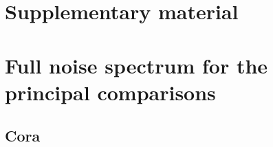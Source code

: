 \documentclass[10pt,letterpaper]{elsarticle}
\begin{document}
\FloatBarrier


\clearpage
\appendix
\section*{Supplementary material}
\renewcommand{\thetable}{\Alph{section}.\arabic{table}}
\renewcommand{\theHtable}{\Alph{section}.\arabic{table}}


\Needspace{395pt}

\FloatBarrier
\setcounter{table}{0}
\section{Full noise spectrum for the principal comparisons}\label{sec:A}

\Needspace{395pt}

\subsection{Cora}\label{sec:A.1}
\end{document}
